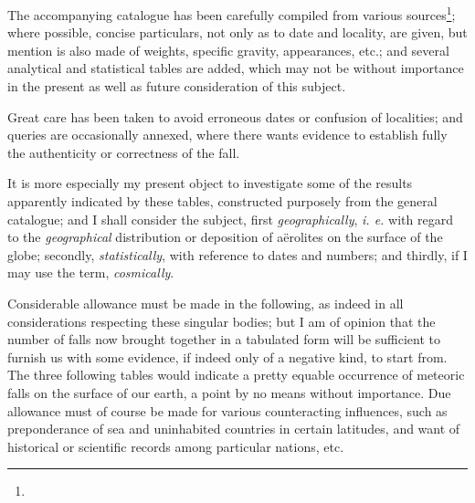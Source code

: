 \documentclass[a4paper, 12pt, oneside]{article}
\begin{document}
The accompanying catalogue has been carefully compiled from various sources\footnote{}; where possible, concise particulars, not only as to date and locality, are given, but mention is also made of weights, specific gravity, appearances, etc.; and several analytical and statistical tables are added, which may not be without importance in the present as well as future consideration of this subject.

Great care has been taken to avoid erroneous dates or confusion of localities; and queries are occasionally annexed, where there wants evidence to establish fully the authenticity or correctness of the fall.

It is more especially my present object to investigate some of the results apparently indicated by these tables, constructed purposely from the general catalogue; and I shall consider the subject, first \emph{geographically}, \emph{i. e.} with regard to the \emph{geographical} distribution or deposition of aërolites on the surface of the globe; secondly, \emph{statistically}, with reference to dates and numbers; and thirdly, if I may use the term, \emph{cosmically}.

Considerable allowance must be made in the following, as indeed in all considerations respecting these singular bodies; but I am of opinion that the number of falls now brought together in a tabulated form will be sufficient to furnish us with some evidence, if indeed only of a negative kind, to start from. The three following tables would indicate a pretty equable occurrence of meteoric falls on the surface of our earth, a point by no means without importance. Due allowance must of course be made for various counteracting influences, such as preponderance of sea and uninhabited countries in certain latitudes, and want of historical or scientific records among particular nations, etc.
\end{document}
